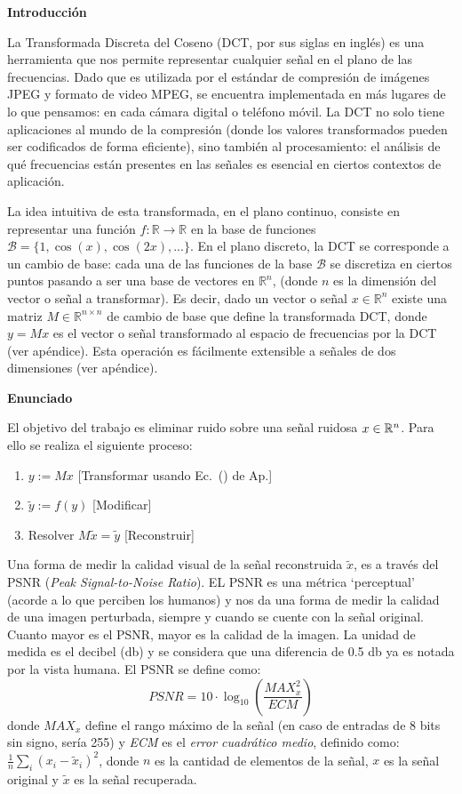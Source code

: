 {\bf Introducci\'on}

La Transformada Discreta del Coseno  (DCT, por sus siglas en ingl\'es) es una herramienta que nos permite representar cualquier se\~nal en el plano de las frecuencias. Dado que es utilizada por el est\'andar de compresi\'on de im\'agenes JPEG y formato de video MPEG, se encuentra implementada en m\'as lugares de lo que pensamos: en cada c\'amara digital o tel\'efono m\'ovil. 
La DCT no solo tiene aplicaciones al mundo de la compresi\'on (donde los valores transformados pueden ser codificados de forma eficiente), sino tambi\'en al procesamiento: el an\'alisis de qu\'e frecuencias est\'an presentes en las se\~nales es esencial en ciertos contextos de aplicaci\'on.

La idea intuitiva de esta transformada, en el plano continuo, consiste en representar una funci\'on $f: \mathbb{R} \rightarrow \mathbb{R}$ en la base de funciones $\mathcal{B}=\{1, \cos(x), \cos(2x),...\}$.
En el plano discreto, la DCT se corresponde a un cambio de base: cada una de las funciones de la base $\mathcal{B}$ se discretiza en ciertos puntos pasando a ser una base de vectores en $\mathbb{R}^n$, (donde $n$ es la dimensi\'on del vector o se\~nal a transformar).
Es decir, dado un vector o se\~nal $x\in\mathbb{R}^n$ existe una matriz $M\in\mathbb{R}^{n\times n}$ de cambio de base que define la transformada DCT, donde $y=Mx$ es el vector o se\~nal transformado al espacio de frecuencias por la DCT (ver ap\'endice). Esta operaci\'on es f\'acilmente extensible a se\~nales de dos dimensiones (ver ap\'endice).


{\bf Enunciado}

El objetivo del trabajo es eliminar ruido sobre una se\~nal ruidosa $x\in\mathbb{R}^{n}$. Para ello se realiza el siguiente proceso: 
\begin{enumerate}
\item  $y:=Mx$ [Transformar usando Ec.~() de Ap.]
\item $\tilde{y} := f(y)$ [Modificar]
\item Resolver $M \tilde{x} = \tilde{y}$ [Reconstruir]
\end{enumerate}

 
Una forma de medir la calidad visual de la se\~nal reconstruida $\tilde{x}$, es a trav\'es del PSNR ({\em Peak Signal-to-Noise Ratio}).
EL PSNR es una m\'etrica `perceptual' (acorde a lo que perciben los humanos) y nos da una forma de medir la calidad de una imagen perturbada, siempre y cuando se cuente con la se\~nal original. 
Cuanto mayor es el PSNR, mayor es la calidad de la imagen. La unidad de medida es el decibel (db) y se considera que una diferencia de 0.5 db ya es notada por la vista humana. El PSNR se define como:
$$
\mathit{PSNR} = 10 \cdot \log_{10} \left( \frac{\mathit{MAX}^2_x}{\mathit{ECM}} \right)
$$
donde $\mathit{MAX}_x$ define el rango m\'aximo de la se\~nal (en caso de entradas de 8 bits sin signo, ser\'ia 255) y \emph{ECM} es el {\em error cuadr\'atico medio}, definido como:
$ \frac{1}{n} \sum_{i}{(x_{i} - \tilde{x}_{i})^2} $,
donde $n$ es la cantidad de elementos de la se\~nal, $x$ es la se\~nal original y $\tilde{x}$ es la se\~nal recuperada.

